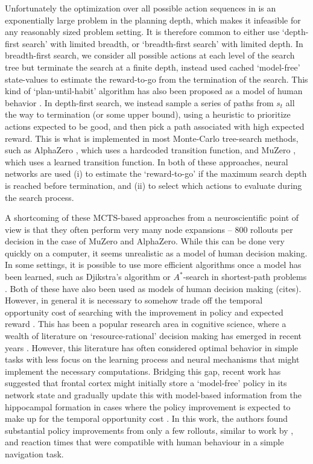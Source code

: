 Unfortunately the optimization over all possible action sequences in  is an exponentially large problem in the planning depth, which makes it infeasible for any reasonably sized problem setting.
It is therefore common to either use `depth-first search' with limited breadth, or `breadth-first search' with limited depth.
In breadth-first search, we consider all possible actions at each level of the search tree but terminate the search at a finite depth, instead used cached `model-free' state-values to estimate the reward-to-go from the termination of the search.
This kind of `plan-until-habit' algorithm has also been proposed as a model of human behavior \citep{keramati2016adaptive}.
In depth-first search, we instead sample a series of paths from $s_t$ all the way to termination (or some upper bound), using a heuristic to prioritize actions expected to be good, and then pick a path associated with high expected reward.
This is what is implemented in most Monte-Carlo tree-search methods, such as AlphaZero \citep{silver2018general}, which uses a hardcoded transition function, and MuZero \citep{schrittwieser2020mastering}, which uses a learned transition function.
In both of these approaches, neural networks are used (i) to estimate the `reward-to-go' if the maximum search depth is reached before termination, and (ii) to select which actions to evaluate during the search process.

A shortcoming of these MCTS-based approaches from a neuroscientific point of view is that they often perform very many node expansions -- 800 rollouts per decision in the case of MuZero and AlphaZero.
While this can be done very quickly on a computer, it seems unrealistic as a model of human decision making.
In some settings, it is possible to use more efficient algorithms once a model has been learned, such as Djikstra's algorithm or $A^*$-search in shortest-path problems \citep{hart1968formal}.
Both of these have also been used as models of human decision making (cites).
However, in general it is necessary to somehow trade off the temporal opportunity cost of searching with the improvement in policy and expected reward \citep{botvinick2014computational}.
This has been a popular research area in cognitive science, where a wealth of literature on `resource-rational' decision making has emerged in recent years \citep{griffiths2019doing,callaway2022rational}.
However, this literature has often considered optimal behavior in simple tasks with less focus on the learning process and neural mechanisms that might implement the necessary computations.
Bridging this gap, recent work has suggested that frontal cortex might initially store a `model-free' policy in its network state and gradually update this with model-based information from the hippocampal formation in cases where the policy improvement is expected to make up for the temporal opportunity cost \citep{jensen2023recurrent}.
In this work, the authors found substantial policy improvements from only a few rollouts, similar to work by \citep{vul2014one}, and reaction times that were compatible with human behaviour in a simple navigation task.

